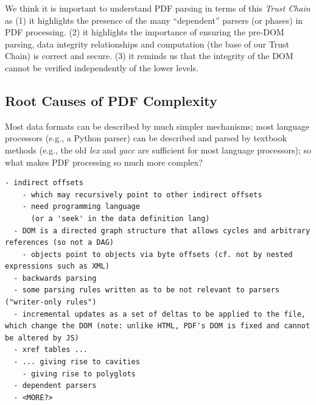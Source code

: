 

We think it is important to understand PDF parsing in terms of this
\emph{Trust Chain} as
%
(1) it highlights the presence of the many ``dependent'' parsers (or phases)
in PDF processing.
%
(2) it highlights the importance of ensuring the pre-DOM parsing, data integrity relationships and
computation (the base of our Trust Chain) is correct and secure.
%
(3) it reminds us that the integrity of the DOM cannot be verified
independently of the lower levels.


\subsection{Root Causes of PDF Complexity}

Most data formats can be described by much simpler mechanisms;
most language processors (e.g., a Python parser) can be described and parsed by
textbook methods (e.g., the old \emph{lex} and \emph{yacc} are sufficient for
most language processors);
so what makes PDF processing so much more complex?
\begin{lstlisting}[style=meta]
  - indirect offsets
    - which may recursively point to other indirect offsets
    - need programming language
      (or a 'seek' in the data definition lang)
  - DOM is a directed graph structure that allows cycles and arbitrary references (so not a DAG)
    - objects point to objects via byte offsets (cf. not by nested expressions such as XML)  
  - backwards parsing
  - some parsing rules written as to be not relevant to parsers ("writer-only rules")
  - incremental updates as a set of deltas to be applied to the file, which change the DOM (note: unlike HTML, PDF's DOM is fixed and cannot be altered by JS)
  - xref tables ...
  - ... giving rise to cavities
    - giving rise to polyglots
  - dependent parsers
  - <MORE?>
\end{lstlisting}

